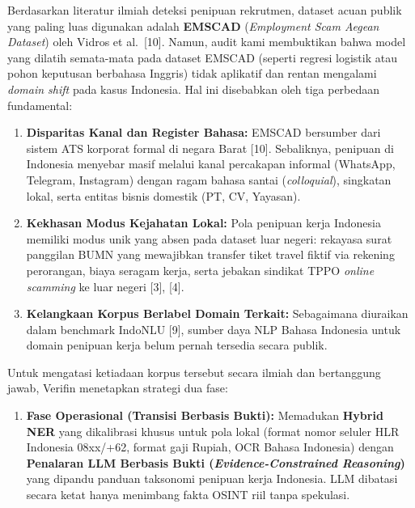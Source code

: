 \documentclass[12pt,a4paper]{article}
\newenvironment{sorotkuning}{%
  \begin{tcolorbox}[
    breakable,
    enhanced,
    frame hidden,
    boxrule=0pt,
    arc=0mm,
    sharp corners,
    colback=yellow!22,
    left=1.5mm, right=1.5mm, top=1.0mm, bottom=1.0mm,
    before skip=1.5pt, after skip=1.5pt
  ]%
}{%
  \end{tcolorbox}%
}
\begin{document}
\begin{sorotkuning}
Berdasarkan literatur ilmiah deteksi penipuan rekrutmen, dataset acuan publik yang paling luas
digunakan adalah \textbf{EMSCAD} (\textit{Employment Scam Aegean Dataset}) oleh Vidros et al.\ [10].
Namun, audit kami membuktikan bahwa model yang dilatih semata-mata pada dataset EMSCAD (seperti regresi
logistik atau pohon keputusan berbahasa Inggris) tidak aplikatif dan rentan mengalami \textit{domain shift} pada kasus Indonesia. Hal ini disebabkan oleh tiga perbedaan fundamental:
\begin{enumerate}[label=\textbf{\alph*.}, leftmargin=*, labelindent=0.65cm, labelsep=0.5em]
\item \textbf{Disparitas Kanal dan Register Bahasa:} EMSCAD bersumber dari sistem ATS korporat formal
      di negara Barat [10]. Sebaliknya, penipuan di Indonesia menyebar masif melalui kanal percakapan
      informal (WhatsApp, Telegram, Instagram) dengan ragam bahasa santai (\textit{colloquial}),
      singkatan lokal, serta entitas bisnis domestik (PT, CV, Yayasan).
\item \textbf{Kekhasan Modus Kejahatan Lokal:} Pola penipuan kerja Indonesia memiliki modus unik yang
      absen pada dataset luar negeri: rekayasa surat panggilan BUMN yang mewajibkan transfer tiket travel
      fiktif via rekening perorangan, biaya seragam kerja, serta jebakan sindikat TPPO \textit{online scamming}
      ke luar negeri [3], [4].
\item \textbf{Kelangkaan Korpus Berlabel Domain Terkait:} Sebagaimana diuraikan dalam benchmark IndoNLU [9],
      sumber daya NLP Bahasa Indonesia untuk domain penipuan kerja belum pernah tersedia secara publik.
\end{enumerate}

Untuk mengatasi ketiadaan korpus tersebut secara ilmiah dan bertanggung jawab, Verifin menetapkan strategi dua fase:
\begin{enumerate}[label=\textbf{\arabic*.}]
\item \textbf{Fase Operasional (Transisi Berbasis Bukti):} Memadukan \textbf{Hybrid NER} yang dikalibrasi
      khusus untuk pola lokal (format nomor seluler HLR Indonesia 08xx/+62, format gaji Rupiah, OCR Bahasa Indonesia)
      dengan \textbf{Penalaran LLM Berbasis Bukti (\textit{Evidence-Constrained Reasoning})} yang dipandu
      panduan taksonomi penipuan kerja Indonesia. LLM dibatasi secara ketat hanya menimbang fakta OSINT riil tanpa spekulasi.
\end{enumerate}
\end{sorotkuning}
\end{document}
